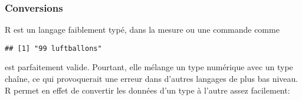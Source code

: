 \subsubsection{Conversions}

R est un langage faiblement typé, dans la mesure ou une commande comme

\begin{knitrout}
\color{fgcolor}\begin{kframe}
\begin{flushleft}
\ttfamily\noindent
{}\hlkeyword{(}\hlkeyword{,}{\ }\hlkeyword{,}{\ }\hlargument{=}{\ }\hlkeyword{)}\mbox{}
\normalfont
\end{flushleft}
\begin{verbatim}
## [1] "99 luftballons"
\end{verbatim}
\end{kframe}
\end{knitrout}


\noindent est parfaitement valide. Pourtant, elle mélange un type numérique avec un type chaîne, ce qui provoquerait une erreur dans d'autres langages de plus bas niveau. R permet en effet de convertir les données d'un type à l'autre assez facilement:

